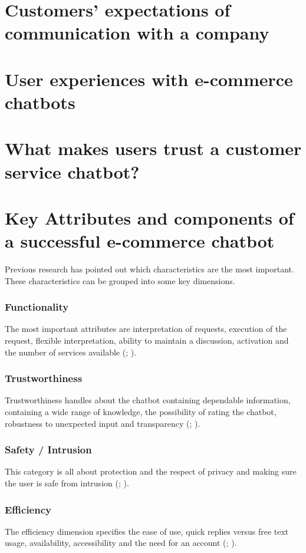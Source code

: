 \section{Customers’ expectations of communication with a company}

\section{User experiences with e-commerce chatbots}

\section{What makes users trust a customer service chatbot?}

\section{Key Attributes and components of a successful e-commerce chatbot}
Previous research has pointed out which characteristics are the most important. These characteristics can be grouped into some key dimensions.

\subsubsection{Functionality}
The most important attributes are interpretation of requests, execution of the request, flexible interpretation, ability to maintain a discussion, activation and the number of services available (\cite{Muizzah2021}; \cite{Verkeyn2018}).

\subsubsection{Trustworthiness}
Trustworthiness handles about the chatbot containing dependable information, containing a wide range of knowledge, the possibility of rating the chatbot, robustness to unexpected input and transparency (\cite{Muizzah2021}; \cite{Verkeyn2018}).

\subsubsection{Safety / Intrusion}
This category is all about protection and the respect of privacy and making sure the user is safe from intrusion (\cite{Muizzah2021}; \cite{Verkeyn2018}).

\subsubsection{Efficiency}
The efficiency dimension specifies the ease of use, quick replies versus free text usage, availability, accessibility and the need for an account (\cite{Muizzah2021}; \cite{Verkeyn2018}). 

